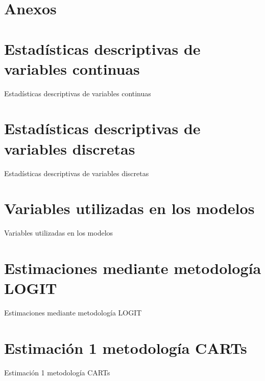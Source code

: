 \documentclass[12pt,a4paper,onecolumn]{article}
\begin{document}

\clearpage
\appendix
\section*{Anexos}

\section{Estadísticas descriptivas de variables continuas}
\begin{table}[htbp]
\centering
\caption{Estadísticas descriptivas de variables continuas}
\label{tab:01_descriptiva_personas_continua}

\end{table}

\section{Estadísticas descriptivas de variables discretas}
\begin{table}[htbp]
\centering
\caption{Estadísticas descriptivas de variables discretas}
\label{tab:02_descriptiva_personas_discreta}

\end{table}

\section{Variables utilizadas en los modelos}
\begin{table}[htbp]
\centering
\caption{Variables utilizadas en los modelos}
\label{tab:03_variables_modelos}

\end{table}

\section{Estimaciones mediante metodología LOGIT}
\begin{table}[htbp]
\centering
\caption{Estimaciones mediante metodología LOGIT}
\label{tab:04_tabla_logit}

\end{table}

\section{Estimación 1 metodología CARTs}
\begin{table}[htbp]
\centering
\caption{Estimación 1 metodología CARTs}
\label{tab:05_tabla_1_cart}

\end{table}
\end{document}
